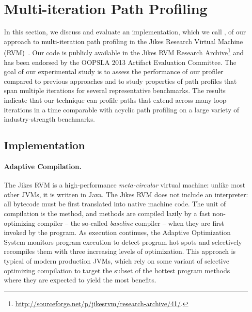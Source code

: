 \section{Multi-iteration Path Profiling}

In this section, we discuss and evaluate an implementation, which we call \kblpp, of our approach to multi-iteration path profiling in the Jikes Research Virtual Machine (RVM)~\cite{Alpern00}. Our code is publicly available in the Jikes RVM Research Archive\footnote{\url{http://sourceforge.net/p/jikesrvm/research-archive/41/}.} and has been endorsed by the OOPSLA 2013 Artifact Evaluation Committee. The goal of our experimental study is to assess the performance of our profiler compared to previous approaches and to study properties of path profiles that span multiple iterations for several representative benchmarks. The results indicate that our technique can profile paths that extend across many loop iterations in a time comparable with acyclic path profiling on a large variety of industry-strength benchmarks.

\subsection{Implementation}
\label{ss:kblpp-implementation}

\paragraph*{Adaptive Compilation.} The Jikes RVM is a high-performance {\em meta-circular} virtual machine: unlike most other JVMs, it is written in Java. The Jikes RVM does not include an interpreter: all bytecode must be first translated into native machine code. The unit of compilation is the method, and methods are compiled lazily by a fast non-optimizing compiler -- the so-called {\em baseline} compiler -- when they are first invoked by the program. As execution continues, the Adaptive Optimization System monitors program execution to detect program hot spots and selectively recompiles them with three increasing levels of optimization. This approach is typical of modern production JVMs, which rely on some variant of selective optimizing compilation to target the subset of the hottest program methods where they are expected to yield the most benefits.

